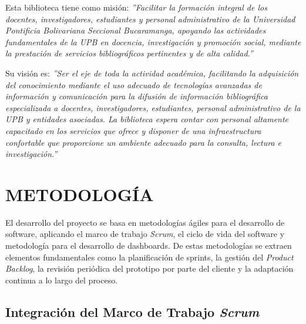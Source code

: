 \documentclass[spanish]{ieee_upb}
\begin{document}
Esta biblioteca tiene como misión:
\textit{''Facilitar la formación integral de los docentes, investigadores, estudiantes y personal administrativo de la Universidad Pontificia Bolivariana Seccional Bucaramanga, apoyando las actividades fundamentales de la UPB en docencia, investigación y promoción social, mediante la prestación de servicios bibliográficos pertinentes y de alta calidad.''}\cite{UPB_Biblioteca}

Su visión es:
\textit{''Ser el eje de toda la actividad académica, facilitando la adquisición del conocimiento mediante el uso adecuado de tecnologías avanzadas de información y comunicación para la difusión de información bibliográfica especializada a docentes, investigadores, estudiantes, personal administrativo de la UPB y entidades asociadas. La biblioteca espera contar con personal altamente capacitado en los servicios que ofrece y disponer de una infraestructura confortable que proporcione un ambiente adecuado para la consulta, lectura e investigación.''} \cite{UPB_Biblioteca}








\newpage
\section{METODOLOGÍA}
\vspace{0.3cm}
El desarrollo del proyecto se basa en metodologías ágiles para el desarrollo de software, aplicando el marco de trabajo \textit{Scrum}, el ciclo de vida del software y metodología para el desarrollo de dashboards. De estas metodologías se extraen elementos fundamentales como la planificación de sprints, la gestión del \textit{Product Backlog}, la revisión periódica del prototipo por parte del cliente y la adaptación continua a lo largo del proceso.


\subsection{Integración del Marco de Trabajo \textit{Scrum}}
\end{document}
